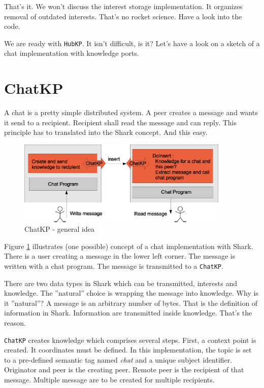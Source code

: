 {That's it. We won't discuss the interest storage implementation. It organizes removal of outdated interests. That's no rocket science. Have a look into the code.

We are ready with {\tt HubKP}. It isn't difficult, is it? Let's have a look on a sketch of a chat implementation with knowledge ports.

\section{ChatKP}
\label{sec:chatkp}
A chat is a pretty simple distributed system. A peer creates a message and wants it send to a recipient. Recipient shall read the message and can reply. This principle has to translated into the Shark concept. And this easy.

\begin{figure}[t]
\centering
\includegraphics[width=0.90\textwidth]{chatKP.eps}
\caption{ChatKP - general idea}
\label{fig:chatKP}
\end{figure}

Figure \ref{fig:chatKP} illustrates (one possible) concept of a chat implementation with Shark. There is a user creating a message in the lower left corner. The message is written with a chat program. The message is transmitted to a {\tt ChatKP}. 

There are two data types in Shark which can be transmitted, interests and knowledge. The ''natural'' choice is wrapping the message into knowledge. Why is it ''natural''? A message is an arbitrary number of bytes. That is the definition of information in Shark. Information are transmitted inside knowledge. That's the reason.

{\tt ChatKP} creates knowledge which comprises several steps. First, a context point is created. It coordinates must be defined. In this implementation, the topic is set to a pre-defined semantic tag named {\it chat} and a unique subject identifier. Originator and peer is the creating peer. Remote peer is the recipient of that message. Multiple message are to be created for multiple recipients.

}
